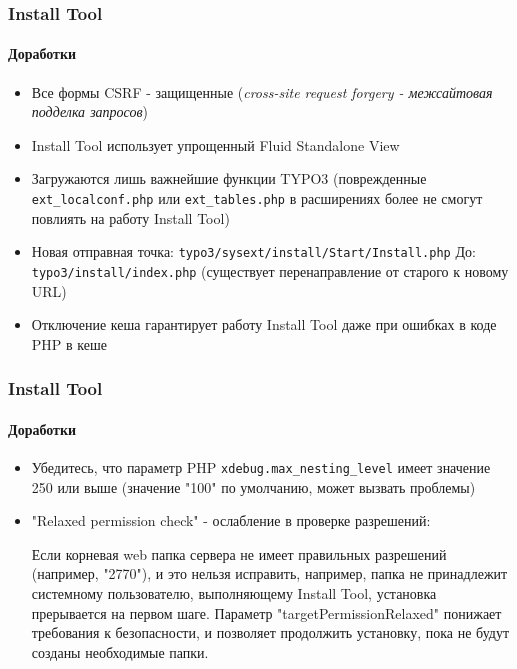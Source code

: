
\begin{frame}[fragile]
	\frametitle{Install Tool}
	\framesubtitle{Доработки}

	\begin{itemize}
		\item Все формы CSRF - защищенные (\textit{cross-site request forgery - межсайтовая подделка запросов})
		\item Install Tool использует упрощенный Fluid Standalone View
		\item Загружаются лишь важнейшие функции TYPO3\newline
			(поврежденные \texttt{ext\_localconf.php} или \texttt{ext\_tables.php} в расширениях более не смогут повлиять на
			работу Install Tool)
		\item Новая отправная точка:	\tabto{3.2cm} \texttt{typo3/sysext/install/Start/Install.php}\newline
			До:					\tabto{3.2cm} \texttt{typo3/install/index.php}\newline
									\tabto{3.2cm} (существует перенаправление от старого к новому URL)
		\item Отключение кеша гарантирует работу Install Tool даже при ошибках в коде PHP в кеше
	\end{itemize}

\end{frame}


\begin{frame}[fragile]
	\frametitle{Install Tool}
	\framesubtitle{Доработки}

	\begin{itemize}
		\item Убедитесь, что параметр PHP \texttt{xdebug.max\_nesting\_level} имеет значение 250 или выше (значение "100" по умолчанию, может вызвать проблемы)
		\item "Relaxed permission check" - ослабление в проверке разрешений:

			\small
				Если корневая web папка сервера не имеет правильных разрешений (например, "2770"),
				и это нельзя исправить, например, папка не принадлежит системному пользователю,
				выполняющему Install Tool, установка прерывается на первом шаге.
				Параметр "targetPermissionRelaxed" понижает требования к безопасности, и позволяет
				продолжить установку, пока не будут созданы необходимые папки.
			\normalsize

	\end{itemize}

\end{frame}

